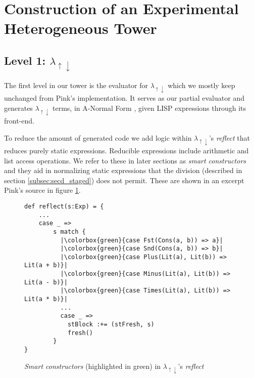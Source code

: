 \documentclass[a4paper,12pt,twoside,openright]{report}
\theoremstyle{definition}
\newcommand{\mslang}{$\lambda_{\uparrow\downarrow}$}
\begin{document}
\section{Construction of an Experimental Heterogeneous Tower}\label{sec:tower}
\subsection{Level 1: \texorpdfstring{\mslang}{Lg}}\label{sec:mslang}

The first level in our tower is the evaluator for \mslang{} which we mostly keep unchanged from Pink's implementation. It serves as our partial evaluator and generates \mslang{} terms, in A-Normal Form \cite{flanagan1993essence}, given LISP expressions through its front-end.

To reduce the amount of generated code we add logic within \mslang's \textit{reflect} that reduces purely static expressions. Reducible expressions include arithmetic and list access operations. We refer to these in later sections as \textit{smart constructors} and they aid in normalizing static expressions that the division (described in section \ref{subsec:secd_staged}) does not permit. These are shown in an excerpt Pink's source in figure \ref{lst:mslang_interp}.

\begin{figure}
    \centering
    \begin{verbatim}
def reflect(s:Exp) = {
    ...
    case _ =>
        s match {
          |\colorbox{green}{case Fst(Cons(a, b)) => a}|
          |\colorbox{green}{case Snd(Cons(a, b)) => b}|
          |\colorbox{green}{case Plus(Lit(a), Lit(b)) => Lit(a + b)}|
          |\colorbox{green}{case Minus(Lit(a), Lit(b)) => Lit(a - b)}|
          |\colorbox{green}{case Times(Lit(a), Lit(b)) => Lit(a * b)}|
          ...
          case _ =>
            stBlock :+= (stFresh, s)
            fresh()
        }
}
    \end{verbatim}
    \caption{\textit{Smart constructors} (highlighted in green) in \mslang's \textit{reflect}}
    \label{lst:mslang_interp}
\end{figure}
\end{document}
